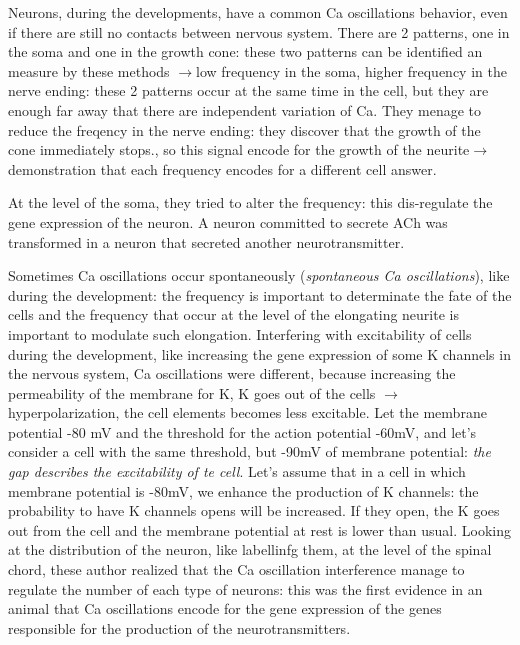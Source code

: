 \documentclass[a4paper, 12pt]{book}
\newcommand{\lfreccia}{\ensuremath{\longrightarrow}}
\begin{document}
Neurons, during the developments, have a common Ca oscillations behavior, even if there are still no contacts between nervous system. There are 2 patterns, one in the soma and one in the growth cone: these two patterns can be identified an measure by these methods \lfreccia low frequency in the soma, higher frequency in the nerve ending: these 2 patterns occur at the same time in the cell, but they are enough far away that there are independent variation of Ca. They menage to reduce the freqency in the nerve ending: they discover that the growth of the cone immediately stops., so this signal encode for the growth of the neurite\lfreccia demonstration that each frequency encodes for a different cell answer. 

At the level of the soma, they tried to alter the frequency: this dis-regulate the gene expression of the neuron. A neuron committed to secrete ACh was transformed in a neuron that secreted another neurotransmitter.


Sometimes Ca oscillations occur spontaneously (\emph{spontaneous Ca oscillations}), like during the development: the frequency is important to determinate the fate of the cells and the frequency that occur at the level of the elongating neurite is important to modulate such elongation. Interfering with excitability of cells during the development, like increasing the gene expression of some K channels in the nervous system, Ca oscillations were different, because increasing the permeability of the membrane for K, K goes out of the cells \lfreccia hyperpolarization, the cell elements becomes less excitable. Let the membrane potential -80 mV and the threshold for the action potential -60mV, and let's consider a cell with the same threshold, but -90mV of membrane potential: \emph{the gap  describes the excitability of te cell}. Let's assume that in a cell in which membrane potential is -80mV, we enhance the production of K channels: the probability to have K channels opens will be increased. If they open, the K goes out from the cell and the membrane potential at rest is lower than usual. Looking at the distribution of the neuron, like labellinfg them, at the level of the spinal chord, these author realized that the Ca oscillation interference manage to regulate the number of each type of neurons: this was the first evidence in an animal that Ca oscillations encode for the gene expression of the genes responsible for the production of the neurotransmitters. 
\end{document}
